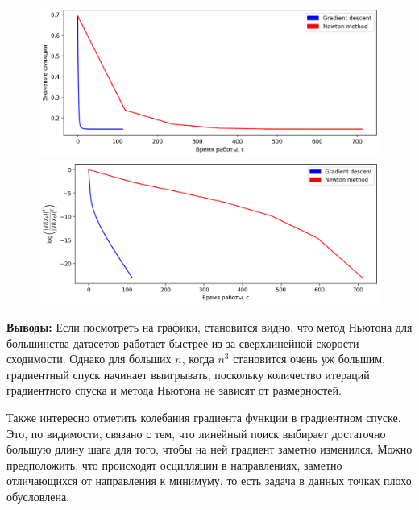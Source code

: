 \documentclass[notitlepage]{article}
\begin{document}
\begin{figure}[ht]
\begin{minipage}[t]{.5\textwidth}
  \centering
  \includegraphics[width=\textwidth, keepaspectratio]{plots/real-sim.bz2_plot_func.png}
\end{minipage}
\begin{minipage}[t]{.5\textwidth}
  \centering
  \includegraphics[width=\textwidth, keepaspectratio]{plots/real-sim.bz2_plot_grad.png}
\end{minipage}
\end{figure}

\large\textbf{Выводы:}
Если посмотреть на графики, становится видно, что метод Ньютона для большинства датасетов работает быстрее из-за сверхлинейной
скорости сходимости.
Однако для больших $n$, когда $n^3$ становится очень уж большим, градиентный спуск начинает выигрывать, поскольку
количество итераций градиентного спуска и метода Ньютона не зависят от размерностей.

Также интересно отметить колебания градиента функции в градиентном спуске.
Это, по видимости, связано с тем, что линейный поиск выбирает
достаточно большую длину шага для того, чтобы на ней градиент заметно изменился.
Можно предположить, что происходят осцилляции в направлениях, заметно отличающихся от направления к минимуму, то есть задача в данных точках плохо обусловлена.
\end{document}
